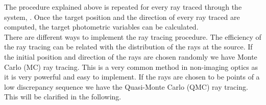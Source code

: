 The procedure explained above is repeated for every ray traced through the system, \cite{Gross2005Handbook}. 
Once the target position and the direction of every ray traced are computed, the target photometric variables can be calculated.\\ \indent
There are different ways to implement the ray tracing procedure. The efficiency of the ray tracing can be related with the distribution of the rays at the source. 
If the initial position and direction of the rays are chosen randomly we have Monte Carlo (MC) ray tracing. 
This is a very common method in non-imaging optics as it is very powerful and easy to implement.
If the rays are chosen to be points of a low discrepancy sequence we have the Quasi-Monte Carlo (QMC) ray tracing.
This will be clarified in the following.

